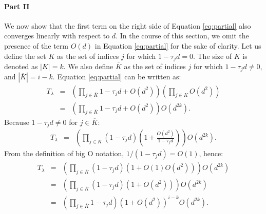 \paragraph*{Part II}
We now show that the first term on the right side of Equation \eqref{eq:partial}
also converges linearly with respect to $d$. In the course of this section, we omit the presence of the term $O(d)$ in Equation \eqref{eq:partial} for the sake of clarity. Let us define the set $K$ as the set of indices $j$ for which $1-\tau_j d = 0$. The size of $K$ is denoted as $|K| = k$. We also define $\overline{K}$ as the set of indices $j$ for which $1-\tau_j d \neq 0$, and $|\overline{K}|=i-k$.  
%
Equation \eqref{eq:partial} can be written as:
\begin{eqnarray}
T_\lambda
& = & \left( \prod_{j \in \overline{K}}1 - \tau_jd + O(d^2) \right) \left( \prod_{j \in K}O(d^2) \right) \\
& = & \left( \prod_{j \in \overline{K}}1 - \tau_jd + O(d^2) \right) O(d^{2k}).
\end{eqnarray}
Because $1-\tau_j d \neq 0$ for $j \in \overline{K}$:
\begin{eqnarray}
T_\lambda
& = &\left( \prod_{j \in \overline{K}} (1 - \tau_jd) \left(1 + \frac{O(d^2)}{1-\tau_j d} \right) \right) O(d^{2k}).
\end{eqnarray}
From the definition of big O notation, $1/(1-\tau_j d) = O(1)$, hence:
\begin{eqnarray}
T_\lambda
& = &\left( \prod_{j \in \overline{K}} (1 - \tau_jd) \left(1 + O(1)O(d^2) \right) \right) O(d^{2k})\\
& = &\left( \prod_{j \in \overline{K}} (1 - \tau_jd) (1 +O(d^2) ) \right) O(d^{2k})\\
& = &\left( \prod_{j \in \overline{K}} 1 - \tau_jd \right) (1 + O(d^2) )^{i-k} O(d^{2k}). \label{eq:k}
\end{eqnarray}

